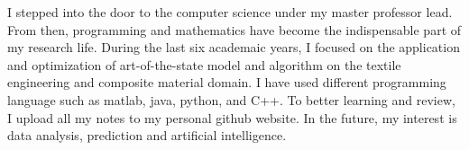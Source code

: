 

\begin{cvparagraph}
I stepped into the door to the computer science under my master professor lead.
From then, programming and mathematics have become the indispensable part of my
research life. During the last six academaic years, I focused on the application
and optimization of art-of-the-state model and algorithm on the textile
engineering and composite material domain. I have used different programming
language such as matlab, java, python, and C++. To better learning and review, I
upload all my notes to my personal github website. In the future, my interest is
data analysis, prediction and artificial intelligence.
\end{cvparagraph}
